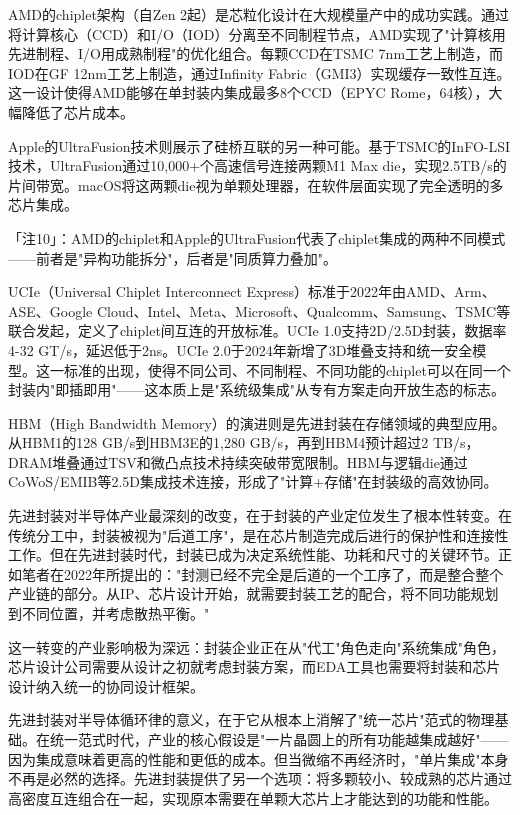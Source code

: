 \documentclass[11pt,a4paper]{article}
\begin{document}
AMD的chiplet架构（自Zen 2起）是芯粒化设计在大规模量产中的成功实践。通过将计算核心（CCD）和I/O（IOD）分离至不同制程节点，AMD实现了"计算核用先进制程、I/O用成熟制程"的优化组合。每颗CCD在TSMC 7nm工艺上制造，而IOD在GF 12nm工艺上制造，通过Infinity Fabric（GMI3）实现缓存一致性互连。这一设计使得AMD能够在单封装内集成最多8个CCD（EPYC Rome，64核），大幅降低了芯片成本。

Apple的UltraFusion技术则展示了硅桥互联的另一种可能。基于TSMC的InFO-LSI技术，UltraFusion通过10,000+个高速信号连接两颗M1 Max die，实现2.5TB/s的片间带宽。macOS将这两颗die视为单颗处理器，在软件层面实现了完全透明的多芯片集成。

「注10」：AMD的chiplet和Apple的UltraFusion代表了chiplet集成的两种不同模式——前者是"异构功能拆分"，后者是"同质算力叠加"。

UCIe（Universal Chiplet Interconnect Express）标准于2022年由AMD、Arm、ASE、Google Cloud、Intel、Meta、Microsoft、Qualcomm、Samsung、TSMC等联合发起，定义了chiplet间互连的开放标准。UCIe 1.0支持2D/2.5D封装，数据率4-32 GT/s，延迟低于2ns。UCIe 2.0于2024年新增了3D堆叠支持和统一安全模型。这一标准的出现，使得不同公司、不同制程、不同功能的chiplet可以在同一个封装内"即插即用"——这本质上是"系统级集成"从专有方案走向开放生态的标志。

HBM（High Bandwidth Memory）的演进则是先进封装在存储领域的典型应用。从HBM1的128 GB/s到HBM3E的1,280 GB/s，再到HBM4预计超过2 TB/s，DRAM堆叠通过TSV和微凸点技术持续突破带宽限制。HBM与逻辑die通过CoWoS/EMIB等2.5D集成技术连接，形成了"计算+存储"在封装级的高效协同。

先进封装对半导体产业最深刻的改变，在于封装的产业定位发生了根本性转变。在传统分工中，封装被视为"后道工序"，是在芯片制造完成后进行的保护性和连接性工作。但在先进封装时代，封装已成为决定系统性能、功耗和尺寸的关键环节。正如笔者在2022年所提出的："封测已经不完全是后道的一个工序了，而是整合整个产业链的部分。从IP、芯片设计开始，就需要封装工艺的配合，将不同功能规划到不同位置，并考虑散热平衡。"

这一转变的产业影响极为深远：封装企业正在从"代工"角色走向"系统集成"角色，芯片设计公司需要从设计之初就考虑封装方案，而EDA工具也需要将封装和芯片设计纳入统一的协同设计框架。

先进封装对半导体循环律的意义，在于它从根本上消解了"统一芯片"范式的物理基础。在统一范式时代，产业的核心假设是"一片晶圆上的所有功能越集成越好"——因为集成意味着更高的性能和更低的成本。但当微缩不再经济时，"单片集成"本身不再是必然的选择。先进封装提供了另一个选项：将多颗较小、较成熟的芯片通过高密度互连组合在一起，实现原本需要在单颗大芯片上才能达到的功能和性能。
\end{document}
